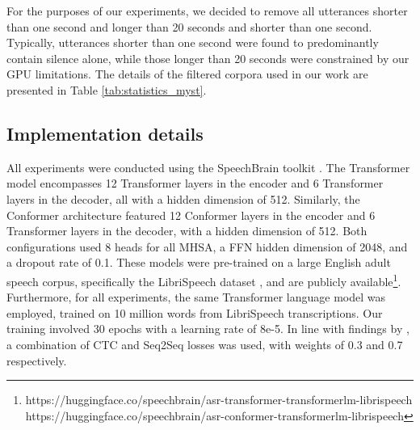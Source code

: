 For the purposes of our experiments, we decided to remove all utterances shorter than one second and longer than 20 seconds and shorter than one second. Typically, utterances shorter than one second were found to predominantly contain silence alone, while those longer than 20 seconds were constrained by our GPU limitations. The details of the filtered corpora used in our work are presented in Table \ref{tab:statistics_myst}. 

\subsection{Implementation details}

All experiments were conducted using the SpeechBrain toolkit \cite{speechbrain}. The Transformer model encompasses 12 Transformer layers in the encoder and 6 Transformer layers in the decoder, all with a hidden dimension of 512. Similarly, the Conformer architecture featured 12 Conformer layers in the encoder and 6 Transformer layers in the decoder, with a hidden dimension of 512. Both configurations used 8 heads for all MHSA, a FFN hidden dimension of 2048, and a dropout rate of 0.1. These models were pre-trained on a large English adult speech corpus, specifically the LibriSpeech dataset \cite{librispeech}, and are publicly available\footnote{https://huggingface.co/speechbrain/asr-transformer-transformerlm-librispeech\\ https://huggingface.co/speechbrain/asr-conformer-transformerlm-librispeech}. Furthermore, for all experiments, the same Transformer language model was employed, trained on 10 million words from LibriSpeech transcriptions. Our training involved 30 epochs with a learning rate of 8e-5. In line with findings by \cite{gelin2021endtoend}, a combination of CTC and Seq2Seq losses was used, with weights of 0.3 and 0.7 respectively.

